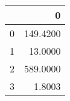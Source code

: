 \begin{tabular}{lr}
\toprule
{} &         0 \\
\midrule
0 &  149.4200 \\
1 &   13.0000 \\
2 &  589.0000 \\
3 &    1.8003 \\
\bottomrule
\end{tabular}
